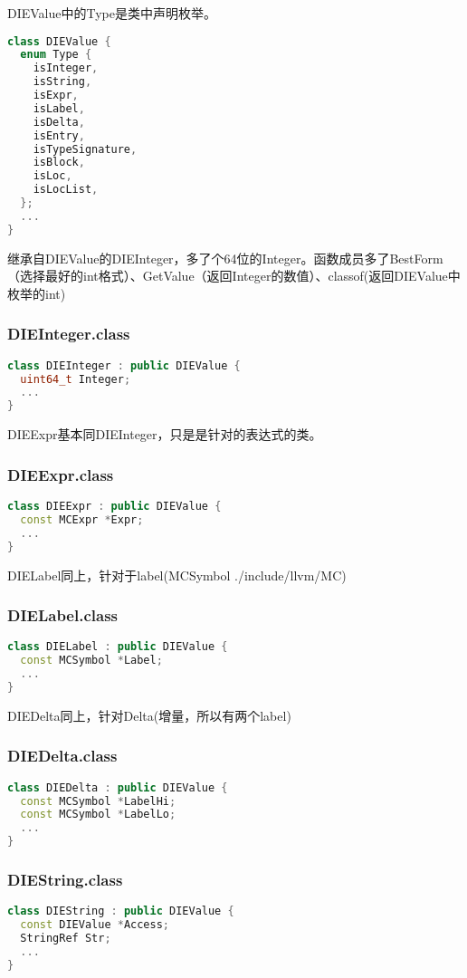 \documentclass{ctexart}
\begin{document}
DIEValue中的Type是类中声明枚举。
\begin{lstlisting}[language=c++]
class DIEValue {
  enum Type {
    isInteger,
    isString,
    isExpr,
    isLabel,
    isDelta,
    isEntry,
    isTypeSignature,
    isBlock,
    isLoc,
    isLocList,
  };
  ...
}
\end{lstlisting}

继承自DIEValue的DIEInteger，多了个64位的Integer。函数成员多了BestForm（选择最好的int格式）、GetValue（返回Integer的数值）、classof(返回DIEValue中枚举的int)
\subsubsection{DIEInteger.class}
\begin{lstlisting}[language=c++]
class DIEInteger : public DIEValue {
  uint64_t Integer;
  ...
}
\end{lstlisting}

DIEExpr基本同DIEInteger，只是是针对的表达式的类。
\subsubsection{DIEExpr.class}
\begin{lstlisting}[language=c++]
class DIEExpr : public DIEValue {
  const MCExpr *Expr;
  ...
}
\end{lstlisting}

DIELabel同上，针对于label(MCSymbol ./include/llvm/MC)
\subsubsection{DIELabel.class}
\begin{lstlisting}[language=c++]
class DIELabel : public DIEValue {
  const MCSymbol *Label;
  ...
}
\end{lstlisting}

DIEDelta同上，针对Delta(增量，所以有两个label)
\subsubsection{DIEDelta.class}
\begin{lstlisting}[language=c++]
class DIEDelta : public DIEValue {
  const MCSymbol *LabelHi;
  const MCSymbol *LabelLo;
  ...
}
\end{lstlisting}

\subsubsection{DIEString.class}
\begin{lstlisting}[language=c++]
class DIEString : public DIEValue {
  const DIEValue *Access;
  StringRef Str;
  ...
}
\end{lstlisting}
\end{document}
